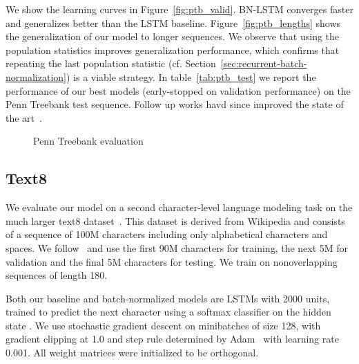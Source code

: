 \documentclass{article} \pdfoutput=1 \usepackage[utf8]{inputenc}
\begin{document}
We show the learning curves in Figure~\ref{fig:ptb_valid}.  BN-LSTM converges
faster and generalizes better than the LSTM baseline.
Figure~\ref{fig:ptb_lengths} shows the generalization of our model to longer
sequences.  We observe that using the population statistics improves
generalization performance, which confirms that repeating the last population
statistic (cf. Section~\ref{sec:recurrent-batch-normalization}) is a viable
strategy.  In table~\ref{tab:ptb_test} we report the performance of our best
models (early-stopped on validation performance) on the Penn Treebank test
sequence.  Follow up works havd since improved the state of the
art~\citep{krueger2016zoneout,chung2016hierarchical,ha2016hypernetworks}.

\begin{figure}[!hb]
  \center {}\hspace{2mm}
  \caption{Penn Treebank evaluation}
  \label{fig:ptb}
\end{figure}

\subsection{Text8}

We evaluate our model on a second character-level language modeling task on the
much larger text8 dataset~\citep{mahoney2009large}.  This dataset is derived
from Wikipedia and consists of a sequence of 100M characters including only
alphabetical characters and spaces.  We
follow~\citet{mikolov2012subword,zhang2016architectural} and use the first 90M
characters for training, the next 5M for validation and the final 5M characters
for testing.  We train on nonoverlapping sequences of length 180.

Both our baseline and batch-normalized models are LSTMs with 2000 units,
trained to predict the next character using a softmax classifier on the hidden
state . We use stochastic gradient descent on minibatches of size
128, with gradient clipping at 1.0 and step rule determined by
Adam~\citep{kingma2014adam} with learning rate 0.001.  All weight matrices were
initialized to be orthogonal.
\end{document}
